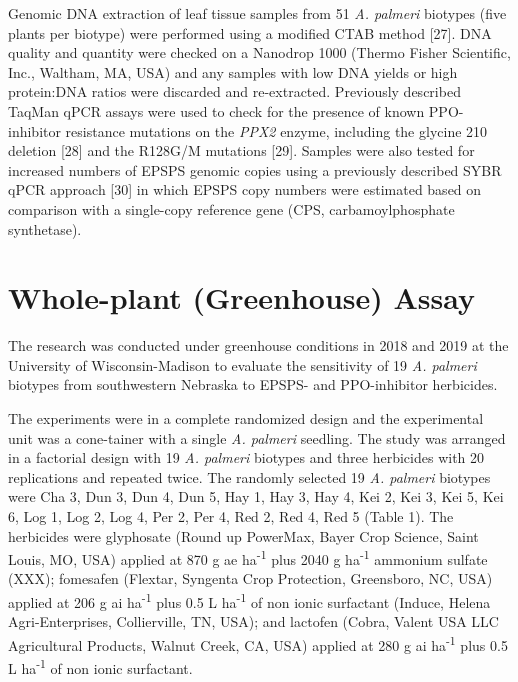 \documentclass[10pt,letterpaper]{article}
\begin{document}
Genomic DNA extraction of leaf tissue samples from 51 \emph{A. palmeri}
biotypes (five plants per biotype) were performed using a modified CTAB
method {[}27{]}. DNA quality and quantity were checked on a Nanodrop
1000 (Thermo Fisher Scientific, Inc., Waltham, MA, USA) and any samples
with low DNA yields or high protein:DNA ratios were discarded and
re-extracted. Previously described TaqMan qPCR assays were used to check
for the presence of known PPO-inhibitor resistance mutations on the
\emph{PPX2} enzyme, including the glycine 210 deletion {[}28{]} and the
R128G/M mutations {[}29{]}. Samples were also tested for increased
numbers of EPSPS genomic copies using a previously described SYBR qPCR
approach {[}30{]} in which EPSPS copy numbers were estimated based on
comparison with a single-copy reference gene (CPS, carbamoylphosphate
synthetase).

\hypertarget{whole-plant-greenhouse-assay}{%
\section{Whole-plant (Greenhouse)
Assay}\label{whole-plant-greenhouse-assay}}

The research was conducted under greenhouse conditions in 2018 and 2019
at the University of Wisconsin-Madison to evaluate the sensitivity of 19
\emph{A. palmeri} biotypes from southwestern Nebraska to EPSPS- and
PPO-inhibitor herbicides.

The experiments were in a complete randomized design and the
experimental unit was a cone-tainer with a single \emph{A. palmeri}
seedling. The study was arranged in a factorial design with 19 \emph{A.
palmeri} biotypes and three herbicides with 20 replications and repeated
twice. The randomly selected 19 \emph{A. palmeri} biotypes were Cha 3,
Dun 3, Dun 4, Dun 5, Hay 1, Hay 3, Hay 4, Kei 2, Kei 3, Kei 5, Kei 6,
Log 1, Log 2, Log 4, Per 2, Per 4, Red 2, Red 4, Red 5 (Table 1). The
herbicides were glyphosate (Round up
PowerMax\textsuperscript \textregistered, Bayer Crop Science, Saint
Louis, MO, USA) applied at 870 g ae ha\textsuperscript{-1} plus 2040 g
ha\textsuperscript{-1} ammonium sulfate (XXX); fomesafen
(Flextar\textsuperscript \textregistered, Syngenta Crop Protection,
Greensboro, NC, USA) applied at 206 g ai ha\textsuperscript{-1} plus 0.5
L ha\textsuperscript{-1} of non ionic surfactant
(Induce\textsuperscript \textregistered, Helena Agri-Enterprises,
Collierville, TN, USA); and lactofen
(Cobra\textsuperscript \textregistered, Valent USA LLC Agricultural
Products, Walnut Creek, CA, USA) applied at 280 g ai
ha\textsuperscript{-1} plus 0.5 L ha\textsuperscript{-1} of non ionic
surfactant.
\end{document}
